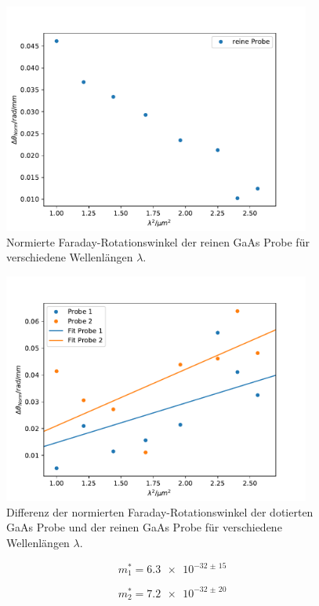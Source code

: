 \begin{figure}
  \centering
  \includegraphics[width = 0.9\textwidth]{Plots/hr_GaAs.pdf}
  \caption{Normierte Faraday-Rotationswinkel der reinen GaAs Probe für verschiedene Wellenlängen $\lambda$.}
  \label{fig:hr}
\end{figure}



\begin{figure}
  \centering
  \includegraphics[width = 0.9\textwidth]{Plots/dotiert_GaAs.pdf}
  \caption{Differenz der normierten Faraday-Rotationswinkel der dotierten GaAs Probe und der reinen GaAs Probe für verschiedene Wellenlängen $\lambda$.}
  \label{fig:dot}
\end{figure}




\begin{equation}
  \label{eqn:eff_m_1}
  m^*_1 = \SI{6.3e-32(15)}
\end{equation}

\begin{equation}
  \label{eqn:eff_m_2}
  m^*_2 = \SI{7.2e-32(20)}
\end{equation}
